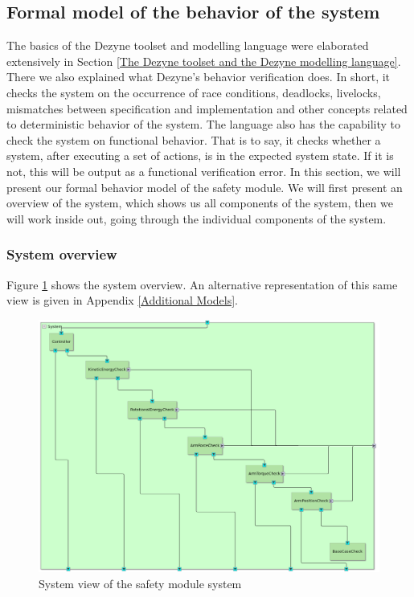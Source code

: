\documentclass[12pt]{scrreprt}
\begin{document}
\subsection{Formal model of the behavior of the system}
\label{Formal model of the behavior of the system}
The basics of the Dezyne toolset and modelling language were elaborated extensively in Section \ref{The Dezyne toolset and the Dezyne modelling language}. There we also explained what Dezyne's behavior verification does. In short, it checks the system on the occurrence of race conditions, deadlocks, livelocks, mismatches between specification and implementation and other concepts related to deterministic behavior of the system. The language also has the capability to check the system on functional behavior. That is to say, it checks whether a system, after executing a set of actions, is in the expected system state. If it is not, this will be output as a functional verification error. In this section, we will present our formal behavior model of the safety module. We will first present an overview of the system, which shows us all components of the system, then we will work inside out, going through the individual components of the system.
\subsubsection{System overview}
\label{System overview}
Figure \ref{fig:safety_module_system_view} shows the system overview. An alternative representation of this same view is given in Appendix \ref{Additional Models}.

\begin{figure}[H]
    \centering
    \includegraphics[width=\textwidth]{Figures/results/modelling_figures/system_view/system_view.png}
    \caption{System view of the safety module system}
    \label{fig:safety_module_system_view}
\end{figure}
\end{document}
